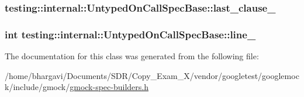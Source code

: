 \subsubsection[{\texorpdfstring{last\+\_\+clause\+\_\+}{last_clause_}}]{ testing\+::internal\+::\+Untyped\+On\+Call\+Spec\+Base\+::last\+\_\+clause\+\_\+\hspace{0.3cm}{\ttfamily [protected]}}\hypertarget{classtesting_1_1internal_1_1_untyped_on_call_spec_base_adb6d19adfeb5fde535d854aedbc5fb0f}{}\label{classtesting_1_1internal_1_1_untyped_on_call_spec_base_adb6d19adfeb5fde535d854aedbc5fb0f}
\subsubsection[{\texorpdfstring{line\+\_\+}{line_}}]{\setlength{\rightskip}{0pt plus 5cm}int testing\+::internal\+::\+Untyped\+On\+Call\+Spec\+Base\+::line\+\_\+\hspace{0.3cm}{\ttfamily [protected]}}\hypertarget{classtesting_1_1internal_1_1_untyped_on_call_spec_base_a1dfa0dafaae6697f17adf5d837ca77c7}{}\label{classtesting_1_1internal_1_1_untyped_on_call_spec_base_a1dfa0dafaae6697f17adf5d837ca77c7}


The documentation for this class was generated from the following file\+:\begin{DoxyCompactItemize}
\item 
/home/bhargavi/\+Documents/\+S\+D\+R/\+Copy\+\_\+\+Exam\+\_\+X/vendor/googletest/googlemock/include/gmock/\hyperlink{gmock-spec-builders_8h}{gmock-\/spec-\/builders.\+h}\end{DoxyCompactItemize}
